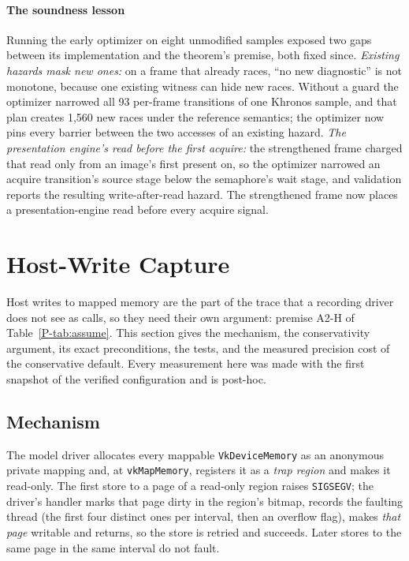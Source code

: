\documentclass[acmtog,anonymous,review]{acmart}
\newcommand{\code}[1]{\texttt{#1}}
\begin{document}
\paragraph{The soundness lesson}
Running the early optimizer on eight unmodified samples exposed two gaps between its implementation and the theorem's
premise, both fixed since. \emph{Existing hazards mask new ones:} on a frame that already races, ``no new
diagnostic'' is not monotone, because one existing witness can hide new races. Without a guard the optimizer narrowed
all 93 per-frame transitions of one Khronos sample, and that plan creates 1,560 new races under the reference
semantics; the optimizer now pins every barrier between the two accesses of an existing hazard. \emph{The
presentation engine's read before the first acquire:} the strengthened frame charged that read only from an image's
first present on, so the optimizer narrowed an acquire transition's source stage below the semaphore's wait stage, and
validation reports the resulting write-after-read hazard. The strengthened frame now places a presentation-engine read
before every acquire signal.


\section{Host-Write Capture}
\label{sec:capture}

Host writes to mapped memory are the part of the trace that a recording driver does not see as calls, so they need
their own argument: premise A2-H of Table~\ref{P-tab:assume}. This section gives the mechanism, the conservativity
argument, its exact preconditions, the tests, and the measured precision cost of the conservative default. Every
measurement here was made with the first snapshot of the verified configuration and is post-hoc.

\subsection{Mechanism}
The model driver allocates every mappable \code{VkDeviceMemory} as an anonymous private mapping and, at
\code{vkMapMemory}, registers it as a \emph{trap region} and makes it read-only. The first store to a page of a
read-only region raises \code{SIGSEGV}; the driver's handler marks that page dirty in the region's bitmap, records the
faulting thread (the first four distinct ones per interval, then an overflow flag), makes \emph{that page} writable and
returns, so the store is retried and succeeds. Later stores to the same page in the same interval do not fault.
\end{document}
